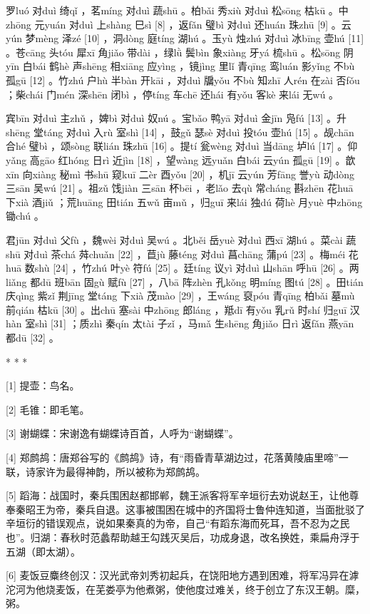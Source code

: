 \documentclass[12pt,UTF8]{ctexbook}
\begin{document}
罗luó 对duì 绮qǐ ，茗míng 对duì 蔬shū 。柏bǎi 秀xiù 对duì 松sōng 枯kū 。中zhōng 元yuán 对duì 上shàng 巳sì [8] ，返fǎn 璧bì 对duì 还huán 珠zhū [9] 。云yún 梦mèng 泽zé [10] ，洞dòng 庭tíng 湖hú 。玉yù 烛zhú 对duì 冰bīng 壶hú [11] 。苍cāng 头tóu 犀xī 角jiǎo 带dài ，绿lǜ 鬓bìn 象xiàng 牙yá 梳shū 。松sōng 阴yīn 白bái 鹤hè 声shēng 相xiāng 应yìng ，镜jìng 里lǐ 青qīng 鸾luán 影yǐng 不bù 孤gū [12] 。竹zhú 户hù 半bàn 开kāi ，对duì 牖yǒu 不bù 知zhī 人rén 在zài 否fǒu ；柴chái 门mén 深shēn 闭bì ，停tíng 车chē 还hái 有yǒu 客kè 来lái 无wú 。

宾bīn 对duì 主zhǔ ，婢bì 对duì 奴nú 。宝bǎo 鸭yā 对duì 金jīn 凫fú [13] 。升shēng 堂táng 对duì 入rù 室shì [14] ，鼓gǔ 瑟sè 对duì 投tóu 壶hú [15] 。觇chān 合hé 璧bì ，颂sòng 联lián 珠zhū [16] 。提tí 瓮wèng 对duì 当dāng 垆lú [17] 。仰yǎng 高gāo 红hóng 日rì 近jìn [18] ，望wàng 远yuǎn 白bái 云yún 孤gū [19] 。歆xīn 向xiàng 秘mì 书shū 窥kuī 二èr 酉yǒu [20] ，机jī 云yún 芳fāng 誉yù 动dòng 三sān 吴wú [21] 。祖zǔ 饯jiàn 三sān 杯bēi ，老lǎo 去qù 常cháng 斟zhēn 花huā 下xià 酒jiǔ ；荒huāng 田tián 五wǔ 亩mǔ ，归guī 来lái 独dú 荷hè 月yuè 中zhōng 锄chú 。

君jūn 对duì 父fù ，魏wèi 对duì 吴wú 。北běi 岳yuè 对duì 西xī 湖hú 。菜cài 蔬shū 对duì 茶chá 荈chuǎn [22] ，苣jù 藤téng 对duì 菖chāng 蒲pú [23] 。梅méi 花huā 数shù [24] ，竹zhú 叶yè 符fú [25] 。廷tíng 议yì 对duì 山shān 呼hū [26] 。两liǎng 都dū 班bān 固gù 赋fù [27] ，八bā 阵zhèn 孔kǒng 明míng 图tú [28] 。田tián 庆qìng 紫zǐ 荆jīng 堂táng 下xià 茂mào [29] ，王wáng 裒póu 青qīng 柏bǎi 墓mù 前qián 枯kū [30] 。出chū 塞sài 中zhōng 郎láng ，羝dī 有yǒu 乳rǔ 时shí 归guī 汉hàn 室shì [31] ；质zhì 秦qín 太tài 子zǐ ，马mǎ 生shēng 角jiǎo 日rì 返fǎn 燕yān 都dū [32] 。



* * *



[1] 提壶：鸟名。

[2] 毛锥：即毛笔。

[3] 谢蝴蝶：宋谢逸有蝴蝶诗百首，人呼为“谢蝴蝶”。

[4] 郑鹧鸪：唐郑谷写的《鹧鸪》诗，有“雨昏青草湖边过，花落黄陵庙里啼”一联，诗家许为最得神韵，所以被称为郑鹧鸪。

[5] 蹈海：战国时，秦兵围困赵都邯郸，魏王派客将军辛垣衍去劝说赵王，让他尊奉秦昭王为帝，秦兵自退。这事被围困在城中的齐国将士鲁仲连知道，当面批驳了辛垣衍的错误观点，说如果秦真的为帝，自己“有蹈东海而死耳，吾不忍为之民也”。归湖：春秋时范蠡帮助越王勾践灭吴后，功成身退，改名换姓，乘扁舟浮于五湖（即太湖）。

[6] 麦饭豆麋终创汉：汉光武帝刘秀初起兵，在饶阳地方遇到困难，将军冯异在滹沱河为他烧麦饭，在芜娄亭为他煮粥，使他度过难关，终于创立了东汉王朝。糜，粥。
\end{document}
